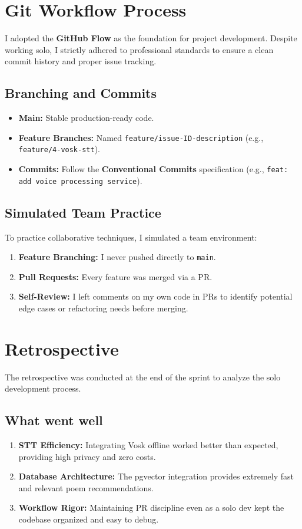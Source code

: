 \documentclass[12pt]{article}
\begin{document}
\section{Git Workflow Process}

I adopted the \textbf{GitHub Flow} as the foundation for project development. Despite working solo, I strictly adhered to professional standards to ensure a clean commit history and proper issue tracking.

\subsection{Branching and Commits}
\begin{itemize}
    \item \textbf{Main:} Stable production-ready code.
    \item \textbf{Feature Branches:} Named \texttt{feature/issue-ID-description} (e.g., \texttt{feature/4-vosk-stt}).
    \item \textbf{Commits:} Follow the \textbf{Conventional Commits} specification (e.g., \texttt{feat: add voice processing service}).
\end{itemize}

\subsection{Simulated Team Practice}
To practice collaborative techniques, I simulated a team environment:
\begin{enumerate}
    \item \textbf{Feature Branching:} I never pushed directly to \texttt{main}.
    \item \textbf{Pull Requests:} Every feature was merged via a PR.
    \item \textbf{Self-Review:} I left comments on my own code in PRs to identify potential edge cases or refactoring needs before merging.
\end{enumerate}

\section{Retrospective}

The retrospective was conducted at the end of the sprint to analyze the solo development process.

\subsection{What went well}
\begin{enumerate}
    \item \textbf{STT Efficiency:} Integrating Vosk offline worked better than expected, providing high privacy and zero costs.
    \item \textbf{Database Architecture:} The pgvector integration provides extremely fast and relevant poem recommendations.
    \item \textbf{Workflow Rigor:} Maintaining PR discipline even as a solo dev kept the codebase organized and easy to debug.
\end{enumerate}
\end{document}
